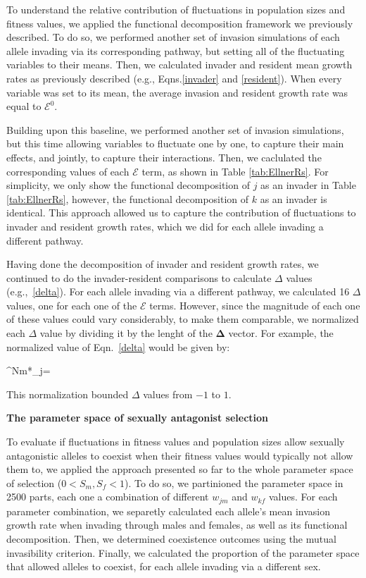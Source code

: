 \documentclass[12pt]{article}
\let\oldequation\equation
\let\oldendequation\endequation
\renewenvironment{equation}
  {\linenomathNonumbers\oldequation}
  {\oldendequation\endlinenomath}
\begin{document}
To understand the relative contribution of fluctuations in population sizes and fitness values, we applied the functional decomposition framework we previously described. To do so, we performed another set of invasion simulations of each allele invading via its corresponding pathway, but setting all of the  fluctuating variables to their means. Then, we calculated invader and resident mean growth rates as previously described (e.g., Eqns.\ref{invader} and \ref{resident}). When every variable was set to its mean, the average invasion and resident growth rate was equal to $\mathcal{E}^{0}$.

Building upon this baseline, we performed another set of invasion simulations, but this time allowing variables to fluctuate one by one, to capture their main effects, and jointly, to capture their interactions. Then, we  caclulated the corresponding values of each $\mathcal{E}$ term, as shown in Table \ref{tab:EllnerRs}. For simplicity, we only show the functional decomposition of $j$ as an invader in Table \ref{tab:EllnerRs}, however, the functional decomposition of $k$ as an invader is identical.  This approach allowed us to capture the contribution of fluctuations to invader and resident growth rates, which we did for each allele invading a different pathway.

Having done the decomposition of invader and resident growth rates, we continued to do the invader-resident comparisons to calculate $\Delta$ values (e.g.,~\ref{delta}). For each allele invading via a different pathway, we calculated 16 $\Delta$ values, one for each one of the $\mathcal{E}$ terms. However, since the magnitude of each one of these values could vary considerably, to make them comparable, we normalized each $\Delta$ value by dividing it by the lenght of the $\boldsymbol{\Delta}$ vector. For example, the normalized value of Eqn.~\ref{delta} would be given by:

\begin{equation}
  \Delta^{Nm*}_{j}= 
\end{equation}

This normalization bounded $\Delta$ values from $-1$ to $1$.

\vspace{5mm}
\noindent\textbf{The parameter space of sexually antagonist selection}

To evaluate if fluctuations in fitness values and population sizes allow sexually antagonistic alleles to coexist when their fitness values would typically not allow them to, we applied the approach presented so far to the whole parameter space of selection  ($ 0 < S_{m}, S_{f} < 1$). To do so, we partinioned the parameter space in 2500 parts, each one a combination of different $w_{jm}$ and $w_{kf}$ values. For each parameter combination, we  separetly calculated each allele's mean invasion growth rate when invading through males and females, as well as its functional decomposition. Then, we determined coexistence outcomes using the mutual invasibility criterion. Finally, we calculated the proportion of the parameter space that allowed alleles to coexist, for each allele invading via a different sex.
\end{document}
